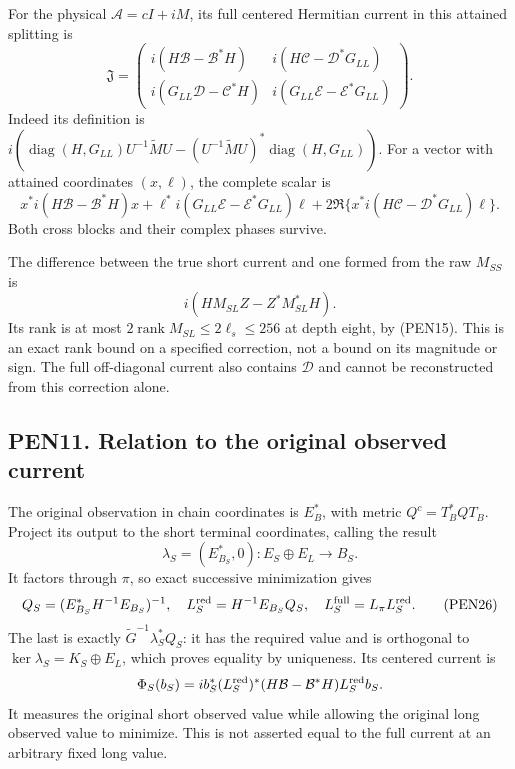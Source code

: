 \documentclass[11pt]{article}
\begin{document}
For the physical \(\mathscr A=cI+iM\), its full centered Hermitian current in this attained splitting is \[
\mathfrak J=
\begin{pmatrix}
i(H\mathcal B-\mathcal B^*H)&i(H\mathcal C-\mathcal D^*G_{LL})\\
i(G_{LL}\mathcal D-\mathcal C^*H)&i(G_{LL}\mathcal E-\mathcal E^*G_{LL})
\end{pmatrix}. \tag{PEN24}
\] Indeed its definition is \(i(\operatorname{diag}(H,G_{LL})U^{-1}\widetilde M U
-(U^{-1}\widetilde M U)^*\operatorname{diag}(H,G_{LL}))\). For a vector with attained coordinates \((x,\ell)\), the complete scalar is \[
x^*i(H\mathcal B-\mathcal B^*H)x
+\ell^*i(G_{LL}\mathcal E-\mathcal E^*G_{LL})\ell
+2\Re\{x^*i(H\mathcal C-\mathcal D^*G_{LL})\ell\}. \tag{PEN25}
\] Both cross blocks and their complex phases survive.

The difference between the true short current and one formed from the raw \(M_{SS}\) is \[
i(HM_{SL}Z-Z^*M_{SL}^*H).
\] Its rank is at most \(2\operatorname{rank}M_{SL}\le2\ell_s\le256\) at depth eight, by (PEN15). This is an exact rank bound on a specified correction, not a bound on its magnitude or sign. The full off-diagonal current also contains \(\mathcal D\) and cannot be reconstructed from this correction alone.

\subsection{PEN11. Relation to the original observed current}\label{pen11.-relation-to-the-original-observed-current}

The original observation in chain coordinates is \(E_B^*\), with metric \(Q^c=T_B^*QT_B\). Project its output to the short terminal coordinates, calling the result \[
\lambda_S=(E_{B_S}^*,0):E_S\oplus E_L\to B_S.
\] It factors through \(\pi\), so exact successive minimization gives \[
Q_S=(E_{B_S}^*H^{-1}E_{B_S})^{-1},\quad
L_S^{\rm red}=H^{-1}E_{B_S}Q_S,\quad
L_S^{\rm full}=L_\pi L_S^{\rm red}. \tag{PEN26}
\] The last is exactly \(\widetilde G^{-1}\lambda_S^*Q_S\): it has the required value and is orthogonal to \(\ker\lambda_S=K_S\oplus E_L\), which proves equality by uniqueness. Its centered current is \[
\Phi_S(b_S)
=i b_S^*(L_S^{\rm red})^*
(H\mathcal B-\mathcal B^*H)L_S^{\rm red}b_S.
\] It measures the original short observed value while allowing the original long observed value to minimize. This is not asserted equal to the full current at an arbitrary fixed long value.
\end{document}
